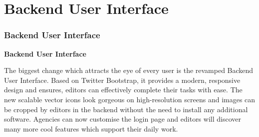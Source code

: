 %

\section{Backend User Interface}
\begin{frame}[fragile]
	\frametitle{Backend User Interface}

	\begin{center}\huge{\color{typo3darkgrey}\textbf{Backend User Interface}}\end{center}

	The biggest change which attracts the eye of every user is the revamped Backend User
	Interface. Based on Twitter Bootstrap, it provides a modern, responsive design and
	ensures, editors can effectively complete their tasks with ease.\newline
	The new scalable vector icons look gorgeous on high-resolution screens and images can
	be cropped by editors in the backend without the need to install any additional
	software.\newline
	Agencies can now customise the login page and editors will discover many more
	cool features which support their daily work.

\end{frame}


